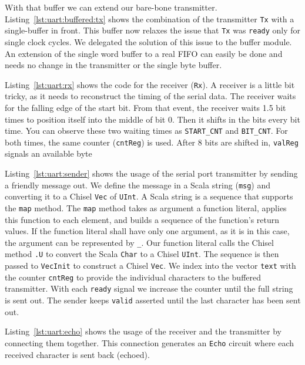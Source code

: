 \documentclass[%
    10pt,
    headinclude, footexclude,
    openright, %
    notitlepage,
    cleardoubleempty,
    headsepline,
    pointlessnumbers,
    bibtotoc, idxtotoc,
    ]{scrbook}
\newcommand{\code}[1]{{\small{\texttt{#1}}}}
\begin{document}
With that buffer we can extend our bare-bone transmitter.
Listing~\ref{lst:uart:buffered:tx} shows the combination of the transmitter \code{Tx}
with a single-buffer in front. This buffer now relaxes the issue that \code{Tx}
was \code{ready} only for single clock cycles. We delegated the solution of
this issue to the buffer module.
An extension of the single word buffer to a real FIFO can easily be done
and needs no change in the transmitter or the single byte buffer.

Listing~\ref{lst:uart:rx} shows the code for the receiver (\code{Rx}).
A receiver is a little bit tricky, as it needs to reconstruct the timing of
the serial data. The receiver waits for the falling edge of the start bit.
From that event, the receiver waits 1.5 bit times to position itself into the middle
of bit 0. Then it shifts in the bits every bit time. You can observe these
two waiting times as \code{START\_CNT} and \code{BIT\_CNT}.
For both times, the same counter (\code{cntReg}) is used.
After 8 bits are shifted in, \code{valReg} signals an available byte

Listing~\ref{lst:uart:sender} shows the usage of the serial port transmitter
by sending a friendly message out. We define the message in a Scala
string (\code{msg}) and converting it to a Chisel \code{Vec} of \code{UInt}.
A Scala string is a sequence that supports the \code{map} method.
The \code{map} method takes as argument a function literal, applies this function to
each element, and builds a sequence of the function's return values.
If the function literal shall have only one argument, as it is in this case, the
argument can be represented by \code{\_}. Our function literal calls
the Chisel method \code{.U} to convert the Scala \code{Char} to a Chisel
\code{UInt}. The sequence is then passed to \code{VecInit} to construct
a Chisel \code{Vec}. We index into the vector \code{text} with the counter
\code{cntReg} to provide the individual characters to the buffered transmitter.
With each \code{ready} signal we increase the counter until the full string
is sent out. The sender keeps \code{valid} asserted until the last character
has been sent out.

Listing~\ref{lst:uart:echo} shows the usage of the receiver and the transmitter
by connecting them together. This connection generates an \code{Echo} circuit where each
received character is sent back (echoed).
\end{document}
